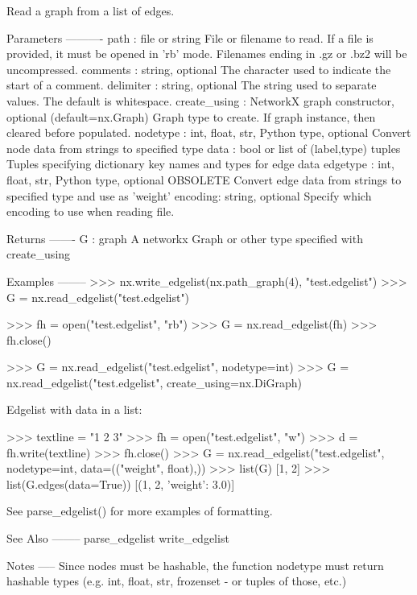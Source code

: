 \begin{DoxyVerb}Read a graph from a list of edges.

Parameters
----------
path : file or string
   File or filename to read. If a file is provided, it must be
   opened in 'rb' mode.
   Filenames ending in .gz or .bz2 will be uncompressed.
comments : string, optional
   The character used to indicate the start of a comment.
delimiter : string, optional
   The string used to separate values.  The default is whitespace.
create_using : NetworkX graph constructor, optional (default=nx.Graph)
   Graph type to create. If graph instance, then cleared before populated.
nodetype : int, float, str, Python type, optional
   Convert node data from strings to specified type
data : bool or list of (label,type) tuples
   Tuples specifying dictionary key names and types for edge data
edgetype : int, float, str, Python type, optional OBSOLETE
   Convert edge data from strings to specified type and use as 'weight'
encoding: string, optional
   Specify which encoding to use when reading file.

Returns
-------
G : graph
   A networkx Graph or other type specified with create_using

Examples
--------
>>> nx.write_edgelist(nx.path_graph(4), "test.edgelist")
>>> G = nx.read_edgelist("test.edgelist")

>>> fh = open("test.edgelist", "rb")
>>> G = nx.read_edgelist(fh)
>>> fh.close()

>>> G = nx.read_edgelist("test.edgelist", nodetype=int)
>>> G = nx.read_edgelist("test.edgelist", create_using=nx.DiGraph)

Edgelist with data in a list:

>>> textline = "1 2 3"
>>> fh = open("test.edgelist", "w")
>>> d = fh.write(textline)
>>> fh.close()
>>> G = nx.read_edgelist("test.edgelist", nodetype=int, data=(("weight", float),))
>>> list(G)
[1, 2]
>>> list(G.edges(data=True))
[(1, 2, {'weight': 3.0})]

See parse_edgelist() for more examples of formatting.

See Also
--------
parse_edgelist
write_edgelist

Notes
-----
Since nodes must be hashable, the function nodetype must return hashable
types (e.g. int, float, str, frozenset - or tuples of those, etc.)
\end{DoxyVerb}
 \mbox{\label{namespacenetworkx_1_1readwrite_1_1edgelist_a2c920d87b2b9d8693d078d35bf8be19d}} 

